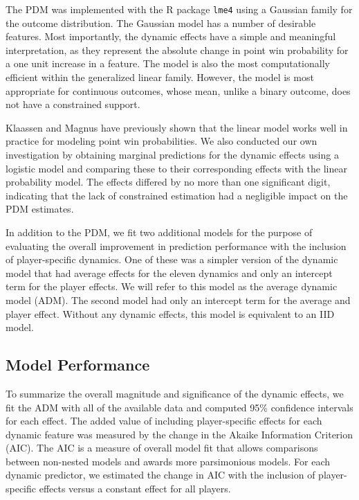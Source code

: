 \documentclass{Latex/svjour3}
\begin{document}
The PDM was implemented with the R  package \texttt{lme4} using a
Gaussian family for the outcome distribution. The Gaussian
model has a number of desirable features. Most importantly, the
dynamic effects have a simple and meaningful interpretation, as they
represent the absolute change in point
win probability for a
one unit increase in a feature. The model is also the most
computationally efficient within the generalized linear
family. However, the model is most appropriate for continuous
outcomes, whose mean, unlike a binary outcome, does not have a
constrained support. 

Klaassen and Magnus
have previously shown that the linear model works well in practice for modeling
point win probabilities. We
also conducted our own investigation by obtaining marginal
predictions for the dynamic effects using a logistic model and
comparing these to their corresponding effects with the linear
probability model. The effects differed by no more than one
significant digit, indicating that the lack of constrained estimation
had a negligible impact on the PDM estimates.

In addition to the PDM, we fit two additional models for the purpose
of evaluating the overall improvement in prediction performance with
the inclusion of player-specific dynamics. One of these was a simpler
version of the dynamic model that had average effects for the eleven
dynamics and only an intercept term for the player effects. We will
refer to this model as the average dynamic model (ADM). The second
model had only an intercept term for the average and player
effect. Without any dynamic effects, this model is equivalent to an
IID model. 

\subsection{Model Performance}

To summarize the overall magnitude and significance of the dynamic
effects, we fit the ADM with all
of the available data and computed 95\% confidence intervals for each
effect.  The added value of including player-specific effects for each
dynamic feature was measured by the change in the Akaike Information
Criterion (AIC). The AIC is a measure of overall model fit that
allows comparisons between non-nested models and awards more parsimonious models. For each
dynamic predictor, we estimated the change in AIC with the inclusion
of player-specific effects versus a constant effect for all players. 
\end{document}
